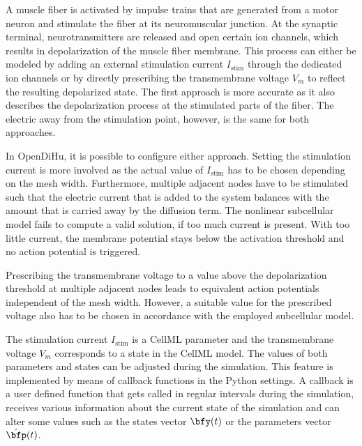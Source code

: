 A muscle fiber is activated by impulse trains that are generated from a motor neuron and stimulate the fiber at its neuromuscular junction. At the synaptic terminal, neurotransmitters are released and open certain ion channels, which results in depolarization of the muscle fiber membrane.
This process can either be modeled by adding an external stimulation current $I_\text{stim}$ through the dedicated ion channels or by directly prescribing the transmembrane voltage $V_m$ to reflect the resulting depolarized state. The first approach is more accurate as it also describes the depolarization process at the stimulated parts of the fiber. The electric  away from the stimulation point, however, is the same for both approaches.

In OpenDiHu, it is possible to configure either approach. Setting the stimulation current is more involved as the actual value of  $I_\text{stim}$ has to be chosen depending on the mesh width. Furthermore, multiple adjacent nodes have to be stimulated such that the electric current that is added to the system balances with the amount that is carried away by the diffusion term. The nonlinear subcellular model fails to compute a valid solution, if too much current is present. With too little current, the membrane potential stays below the activation threshold and no action potential is triggered. 

Prescribing the transmembrane voltage to a value above the depolarization threshold at multiple adjacent nodes leads to equivalent action potentials independent of the mesh width. However, a suitable value for the prescribed voltage also has to be chosen in accordance with the employed subcellular model.

The stimulation current $I_\text{stim}$ is a CellML parameter and the transmembrane voltage $V_m$ corresponds to a state in the CellML model. The values of both parameters and states can be adjusted during the simulation. This feature is implemented by means of callback functions in the Python settings. A callback is a user defined function that gets called in regular intervals during the simulation, receives various information about the current state of the simulation and can alter some values such as the states vector $\bfy(t)$ or the parameters vector $\hat{\bfp}(t)$.


